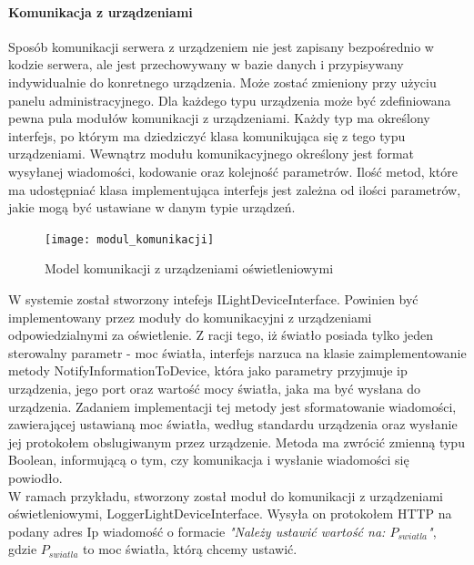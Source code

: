 \documentclass{article}
\begin{document}
		\paragraph{Komunikacja z urządzeniami}
		Sposób komunikacji serwera z urządzeniem nie jest zapisany bezpośrednio w kodzie serwera, ale jest przechowywany w bazie danych i przypisywany indywidualnie do konretnego urządzenia. Może zostać zmieniony przy użyciu panelu administracyjnego. Dla każdego typu urządzenia może być zdefiniowana pewna pula modułów komunikacji z urządzeniami. Każdy typ ma określony interfejs, po którym ma dziedziczyć klasa komunikująca się z tego typu urządzeniami. Wewnątrz modułu komunikacyjnego określony jest format wysyłanej wiadomości, kodowanie oraz kolejność parametrów. Ilość metod, które ma udostępniać klasa implementująca interfejs jest zależna od ilości parametrów, jakie mogą być ustawiane w danym typie urządzeń.
		\begin{figure}[H]			
			\centering
			\caption{Model komunikacji z urządzeniami oświetleniowymi}
			\texttt{[image: modul\_komunikacji]}
		\end{figure}
		W systemie został stworzony intefejs ILightDeviceInterface. Powinien być implementowany przez moduły do komunikacyjni z urządzeniami odpowiedzialnymi za oświetlenie. Z racji tego, iż światło posiada tylko jeden sterowalny parametr - moc światła, interfejs narzuca na klasie zaimplementowanie metody NotifyInformationToDevice, która jako parametry przyjmuje ip urządzenia, jego port oraz wartość mocy światła, jaka ma być wysłana do urządzenia. Zadaniem implementacji tej metody jest sformatowanie wiadomości, zawierającej ustawianą moc światła, według standardu urządzenia oraz wysłanie jej protokołem obslugiwanym przez urządzenie. Metoda ma zwrócić zmienną typu Boolean, informującą o tym, czy komunikacja i wysłanie wiadomości się powiodło.\\		
		W ramach przykładu, stworzony został moduł do komunikacji z urządzeniami oświetleniowymi, LoggerLightDeviceInterface. Wysyła on protokołem HTTP na podany adres Ip wiadomość o formacie \textit{"Należy ustawić wartość na: $P_{swiatla}$"}, gdzie $P_{swiatla}$ to moc światła, którą chcemy ustawić.
\end{document}
